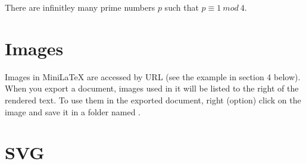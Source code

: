\begin{theorem}
There are infinitley many prime numbers
$p$ such that $p \equiv 1\ mod\ 4$.
\end{theorem}

\section{Images}

Images in MiniLaTeX are accessed by URL (see the example
in section 4 below). When you export a document, images
used in it will be listed to the right
of the rendered text.  To use them in the exported
document, right (option) click on the image and
save it in a folder named .


\section{SVG}

